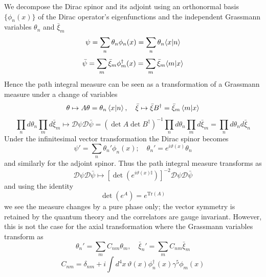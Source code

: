 \documentclass[11pt, a4paper]{article}
\theoremstyle{definition}
\theoremstyle{plain}
\begin{document}
We decompose the Dirac spinor and its adjoint using an orthonormal basis $\{ \phi_n(x) \}$ of
the Dirac operator's eigenfunctions and the independent Grassmann variables 
$\theta_n$ and $\bar{\xi}_m$
\begin{equation}
  \psi = \sum_n{\theta_n\phi_n(x)} = \sum_n{\theta_n\!\braket{x|n}}
\end{equation}
\begin{equation}
  \bar{\psi} = \sum_m{\bar{\xi}_m\phi^{\dagger}_m(x)} = \sum_m{\bar{\xi}_m\!\braket{m|x}}
  \end{equation}
Hence the path integral measure can be seen as a transformation of a Grassmann measure
under a change of variables
\begin{equation}
  \theta \mapsto A\theta = \theta_n\braket{x|n},\quad
  \bar{\xi} \mapsto \bar{\xi}B^{\dagger} = \bar{\xi}_m\braket{m|x}
\end{equation}
\begin{equation}
  \prod_n{d\theta_n}\prod_m{d\bar{\xi}_m} \mapsto \mathcal{D}\psi\mathcal{D}\bar{\psi}
  = {(\det{A}\det{B^\dagger})}^{-1}\prod_n{d\theta_n}\prod_m{d\bar{\xi}_m}
  = \prod_n{d\theta_n d\bar{\xi}_n} 
\end{equation}
Under the infinitesimal vector transformation the Dirac spinor becomes
\begin{equation}
  \psi' = \sum_n{\theta_n'\phi_n(x)} ;\quad \theta_n' = e^{i\vartheta(x)}\theta_n
\end{equation}
and similarly for the adjoint spinor. Thus the path integral measure transforms as
\begin{equation}
  \mathcal{D}\psi\mathcal{D}\bar{\psi} \mapsto
  {\left[\det\left(e^{i\vartheta(x)\mathbb{I}}\right)\right]}^{-2} \mathcal{D}\psi\mathcal{D}\bar{\psi}
\end{equation}
and using the identity
\begin{equation}
  \det\left( e^{A}\right) = e^{\mathrm{Tr}(A)}
\end{equation}
we see the measure changes by a pure phase only; the vector symmetry is retained
by the quantum theory and the correlators are gauge invariant.
However, this is not the case for the axial transformation
where the Grassmann variables transform as
\begin{equation}
  \theta_n' = \sum_m{C_{nm} \theta_m} ,\quad \bar{\xi}_n' = \sum_m{C_{nm} \bar{\xi}_m}
\end{equation}
\begin{equation}
  C_{nm} = \delta_{nm} +i\int{d^4x\, \vartheta(x)\phi_{n}^{\dagger}(x)\gamma^5\phi_m(x)}
\end{equation}
\end{document}
